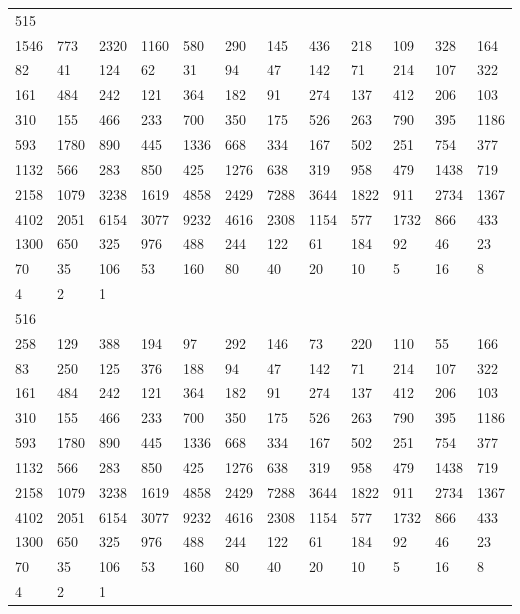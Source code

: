\begin{longtable}{llllllllllll}
515&&&&&&&&&&&\\
1546& 773& 2320& 1160& 580& 290& 145& 436& 218& 109& 328& 164\\
82& 41& 124& 62& 31& 94& 47& 142& 71& 214& 107& 322\\
161& 484& 242& 121& 364& 182& 91& 274& 137& 412& 206& 103\\
310& 155& 466& 233& 700& 350& 175& 526& 263& 790& 395& 1186\\
593& 1780& 890& 445& 1336& 668& 334& 167& 502& 251& 754& 377\\
1132& 566& 283& 850& 425& 1276& 638& 319& 958& 479& 1438& 719\\
2158& 1079& 3238& 1619& 4858& 2429& 7288& 3644& 1822& 911& 2734& 1367\\
4102& 2051& 6154& 3077& 9232& 4616& 2308& 1154& 577& 1732& 866& 433\\
1300& 650& 325& 976& 488& 244& 122& 61& 184& 92& 46& 23\\
70& 35& 106& 53& 160& 80& 40& 20& 10& 5& 16& 8\\
4& 2& 1& \\

516&&&&&&&&&&&\\
258& 129& 388& 194& 97& 292& 146& 73& 220& 110& 55& 166\\
83& 250& 125& 376& 188& 94& 47& 142& 71& 214& 107& 322\\
161& 484& 242& 121& 364& 182& 91& 274& 137& 412& 206& 103\\
310& 155& 466& 233& 700& 350& 175& 526& 263& 790& 395& 1186\\
593& 1780& 890& 445& 1336& 668& 334& 167& 502& 251& 754& 377\\
1132& 566& 283& 850& 425& 1276& 638& 319& 958& 479& 1438& 719\\
2158& 1079& 3238& 1619& 4858& 2429& 7288& 3644& 1822& 911& 2734& 1367\\
4102& 2051& 6154& 3077& 9232& 4616& 2308& 1154& 577& 1732& 866& 433\\
1300& 650& 325& 976& 488& 244& 122& 61& 184& 92& 46& 23\\
70& 35& 106& 53& 160& 80& 40& 20& 10& 5& 16& 8\\
4& 2& 1& \\


\end{longtable}
